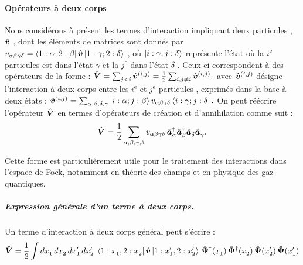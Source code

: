 \paragraph{Opérateurs à deux corps}

Nous considérons à présent les termes d’interaction impliquant deux particules , $\hat{\bm{v}}$ , dont les éléments de matrices sont donnés par $v_{\alpha \beta \gamma \delta} = \bra{ 1 : \alpha; 2 : \beta } \hat{\bm{v}}\ket{ 1 : \gamma; 2 : \delta }$ , où $\ket{ i : \gamma; j : \delta }$ représente l'état où la $i^\text{e}$  particules est dans l'état $\gamma$ et la $j^\text{e}$ dans l'état $\delta$  . Ceux-ci correspondent à des opérateurs de la forme :
\(
    \hat{\bm{V}} = \sum_{j < i} \hat{\bm{v}}^{(i, j)} = \frac{1}{2} \sum_{i, j \ne i} \hat{\bm{v}}^{(i, j)}
    \label{eq:V2corps}.
\)
avec $\hat{\bm{v}}^{(i, j)}$ désigne l’interaction à deux corps entre les $i^\text{e}$ et $j^\text{e}$ particules , exprimés dans la base à deux états :
\(
	\hat{\bm{v}}^{(i, j)} = \sum_{\alpha,\beta,\delta,\gamma} \ket{i : \alpha; j : \beta }v_{\alpha \beta \gamma \delta} \bra{ i : \gamma; j : \delta }.
    \label{eq:matriceV}
\)
On peut réécrire l’opérateur \( \hat{\bm{V}} \) en termes d’opérateurs de création et d’annihilation comme suit :
\begin{equation}
    \hat{\bm{V}} = \frac{1}{2} \sum_{\alpha, \beta, \gamma, \delta} v_{\alpha \beta \gamma \delta} \, \hat{\bm{a}}^\dagger_\alpha \hat{\bm{a}}^\dagger_\beta \hat{\bm{a}}_\delta^{} \hat{\bm{a}}_\gamma^{}.
    \label{eq:Vcreation}
\end{equation}

Cette forme est particulièrement utile pour le traitement des interactions dans l’espace de Fock, notamment en théorie des champs et en physique des gaz quantiques.

\subparagraph{Expression générale d’un terme à deux corps. }

Un terme d’interaction à deux corps général peut s’écrire :
\begin{equation}
    \hat{\bm{V}} = \frac{1}{2} \int dx_1^{} \, dx_2^{} \, dx_1' \, dx_2' \; 
    \bra{ 1 : x_1^{}, 2 : x_2^{} } \hat{\bm{v}} \ket{ 1 : x_1', 2 : x_2' } \,
    \hat{\bm{\Psi}}^\dagger(x_1^{}) \, \hat{\bm{\Psi}}^\dagger(x_2^{}) \, 
    \hat{\bm{\Psi}}(x_2') \, \hat{\bm{\Psi}}(x_1')
    \label{eq:V_general}
\end{equation}

